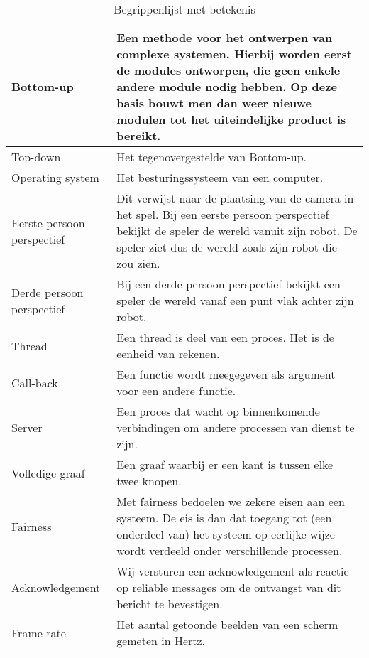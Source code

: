 \begin{table}[H]
\begin{tabular}{| l | p{12cm} |}
        Bottom-up & Een methode voor het ontwerpen van complexe systemen. Hierbij worden eerst de modules ontworpen, die geen enkele andere
            module nodig hebben. Op deze basis bouwt men dan weer nieuwe modulen tot het uiteindelijke product is bereikt. \\ \hline
        Top-down & Het tegenovergestelde van Bottom-up.\\ \hline
        Operating system & Het besturingssysteem van een computer. \\ \hline
        Eerste persoon perspectief & Dit verwijst naar de plaatsing van de camera in het spel. Bij een eerste persoon perspectief
            bekijkt de speler de wereld vanuit zijn robot. De speler ziet dus de wereld zoals zijn robot die zou zien. \\ \hline
        Derde persoon perspectief & Bij een derde persoon perspectief bekijkt een speler de wereld vanaf een punt vlak achter
            zijn robot. \\ \hline
        Thread & Een thread is deel van een proces. Het is de eenheid van rekenen. \\ \hline
        Call-back & Een functie wordt meegegeven als argument voor een andere functie. \\ \hline
        Server & Een proces dat wacht op binnenkomende verbindingen om andere processen van dienst te zijn. \\ \hline
        Volledige graaf & Een graaf waarbij er een kant is tussen elke twee knopen. \\ \hline
        Fairness & Met fairness bedoelen we zekere eisen aan een systeem. De eis is dan dat toegang tot (een onderdeel van) het systeem
            op eerlijke wijze wordt verdeeld onder verschillende processen. \\ \hline
        Acknowledgement & Wij versturen een acknowledgement als reactie op reliable messages om de ontvangst van dit bericht te bevestigen. \\ \hline
        Frame rate & Het aantal getoonde beelden van een scherm gemeten in Hertz. \\ \hline
        \end{tabular}
        \caption{Begrippenlijst met betekenis}
        \label{tab:planning}
    \end{table} 